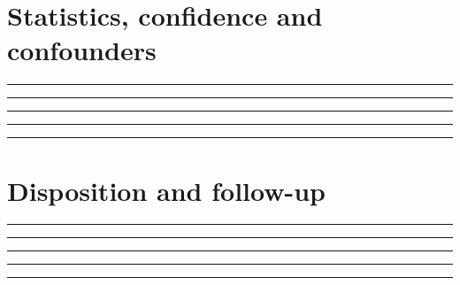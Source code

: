 \documentclass[11pt,letterpaper]{article}
\begin{document}
\section{Statistics, confidence and confounders}
\vspace{2mm}
\noindent\rule{0.93\linewidth}{0.4pt}\par\vspace{13pt}
\noindent\rule{0.93\linewidth}{0.4pt}\par\vspace{13pt}
\noindent\rule{0.93\linewidth}{0.4pt}\par\vspace{13pt}
\noindent\rule{0.93\linewidth}{0.4pt}\par\vspace{13pt}
\noindent\rule{0.93\linewidth}{0.4pt}\par\vspace{13pt}
\section{Disposition and follow-up}
\vspace{2mm}
\noindent\rule{0.93\linewidth}{0.4pt}\par\vspace{13pt}
\noindent\rule{0.93\linewidth}{0.4pt}\par\vspace{13pt}
\noindent\rule{0.93\linewidth}{0.4pt}\par\vspace{13pt}
\noindent\rule{0.93\linewidth}{0.4pt}\par\vspace{13pt}
\noindent\rule{0.93\linewidth}{0.4pt}\par\vspace{13pt}
\end{document}
